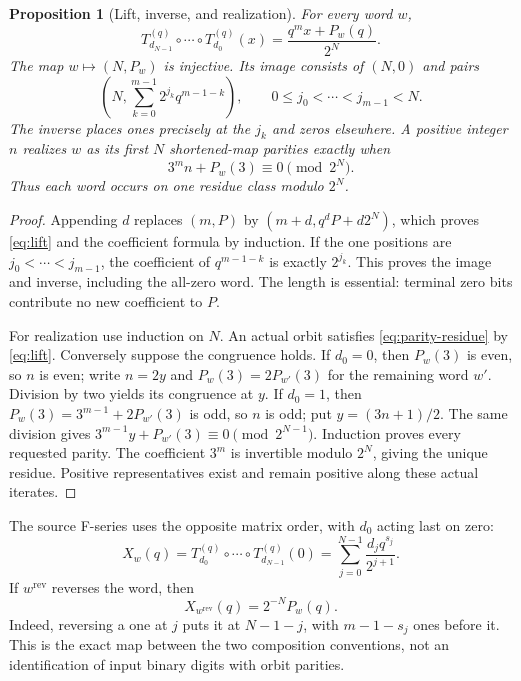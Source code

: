 \documentclass[11pt]{amsart}
\newtheorem{proposition}[theorem]{Proposition}
\theoremstyle{remark}\newtheorem{remark}[theorem]{Remark}
\begin{document}
\begin{proposition}[Lift, inverse, and realization]\label{prop:lift}
For every word $w$,
\begin{equation}\label{eq:lift}
 T_{d_{N-1}}^{(q)}\circ\cdots\circ T_{d_0}^{(q)}(x)
 =\frac{q^m x+P_w(q)}{2^N}.
\end{equation}
The map $w\mapsto(N,P_w)$ is injective. Its image consists of $(N,0)$
and pairs
\[
 \left(N,\sum_{k=0}^{m-1}2^{j_k}q^{m-1-k}\right),
 \qquad 0\le j_0<\cdots<j_{m-1}<N.
\]
The inverse places ones precisely at the $j_k$ and zeros elsewhere.
A positive integer $n$ realizes $w$ as its first $N$ shortened-map
parities exactly when
\begin{equation}\label{eq:parity-residue}
 3^m n+P_w(3)\equiv0\pmod{2^N}.
\end{equation}
Thus each word occurs on one residue class modulo $2^N$.
\end{proposition}
\begin{proof}
Appending $d$ replaces $(m,P)$ by $(m+d,q^dP+d2^N)$, which proves
\eqref{eq:lift} and the coefficient formula by induction. If the one
positions are $j_0<\cdots<j_{m-1}$, the coefficient of $q^{m-1-k}$
is exactly $2^{j_k}$. This proves the image and inverse, including the
all-zero word. The length is essential: terminal zero bits contribute
no new coefficient to $P$.

For realization use induction on $N$. An actual orbit satisfies
\eqref{eq:parity-residue} by \eqref{eq:lift}. Conversely suppose the
congruence holds. If $d_0=0$, then $P_w(3)$ is even, so $n$ is even;
write $n=2y$ and $P_w(3)=2P_{w'}(3)$ for the remaining word $w'$.
Division by two yields its congruence at $y$. If $d_0=1$, then
$P_w(3)=3^{m-1}+2P_{w'}(3)$ is odd, so $n$ is odd; put
$y=(3n+1)/2$. The same division gives
$3^{m-1}y+P_{w'}(3)\equiv0\pmod{2^{N-1}}$.
Induction proves every requested parity. The coefficient $3^m$ is
invertible modulo $2^N$, giving the unique residue. Positive representatives
exist and remain positive along these actual iterates.
\end{proof}

The source F-series uses the opposite matrix order, with $d_0$ acting
last on zero:
\[
 X_w(q)=T_{d_0}^{(q)}\circ\cdots\circ T_{d_{N-1}}^{(q)}(0)
 =\sum_{j=0}^{N-1}\frac{d_jq^{s_j}}{2^{j+1}}.
\]
If $w^{\mathrm{rev}}$ reverses the word, then
\[
 X_{w^{\mathrm{rev}}}(q)=2^{-N}P_w(q).
\]
Indeed, reversing a one at $j$ puts it at $N-1-j$, with $m-1-s_j$
ones before it. This is the exact map between the two composition
conventions, not an identification of input binary digits with orbit parities.
\end{document}
